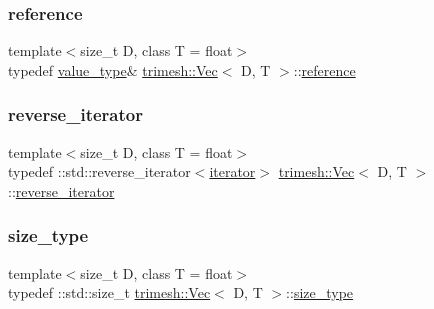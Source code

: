 \mbox{\label{classtrimesh_1_1Vec_ad76bb92c986524d251998d6eae7d2825}} 
\subsubsection{\texorpdfstring{reference}{reference}}
{\footnotesize\ttfamily template$<$size\+\_\+t D, class T = float$>$ \\
typedef \hyperlink{classtrimesh_1_1Vec_a10a59253996e42d67c713f37592669df}{value\+\_\+type}\& \hyperlink{classtrimesh_1_1Vec}{trimesh\+::\+Vec}$<$ D, T $>$\+::\hyperlink{classtrimesh_1_1Vec_ad76bb92c986524d251998d6eae7d2825}{reference}}

\mbox{\label{classtrimesh_1_1Vec_a42a460e6f54561faf9975298d46807ec}} 
\subsubsection{\texorpdfstring{reverse\+\_\+iterator}{reverse\_iterator}}
{\footnotesize\ttfamily template$<$size\+\_\+t D, class T = float$>$ \\
typedef \+::std\+::reverse\+\_\+iterator$<$\hyperlink{classtrimesh_1_1Vec_ae21cfb5c00b53dc906ddc4f939ca8d22}{iterator}$>$ \hyperlink{classtrimesh_1_1Vec}{trimesh\+::\+Vec}$<$ D, T $>$\+::\hyperlink{classtrimesh_1_1Vec_a42a460e6f54561faf9975298d46807ec}{reverse\+\_\+iterator}}

\mbox{\label{classtrimesh_1_1Vec_a65397e05ed96e7723cf2d54dfff0ad0a}} 
\subsubsection{\texorpdfstring{size\+\_\+type}{size\_type}}
{\footnotesize\ttfamily template$<$size\+\_\+t D, class T = float$>$ \\
typedef \+::std\+::size\+\_\+t \hyperlink{classtrimesh_1_1Vec}{trimesh\+::\+Vec}$<$ D, T $>$\+::\hyperlink{classtrimesh_1_1Vec_a65397e05ed96e7723cf2d54dfff0ad0a}{size\+\_\+type}}

